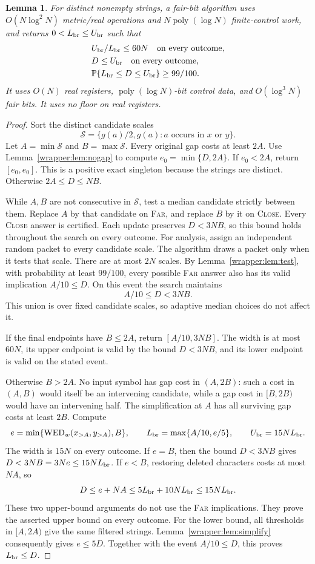 \documentclass[11pt]{article}
\newtheorem{lemma}[theorem]{Lemma}
\theoremstyle{definition}
\newcommand{\WED}{\operatorname{WED}}
\newcommand{\Prb}{\mathbb P}
\newcommand{\1}{\mathbf 1}
\begin{document}
\begin{lemma}\label{wrapper:lem:bracket}
For distinct nonempty strings, a fair-bit algorithm uses
$O(N\log^2N)$ metric/real operations and $N\operatorname{poly}(\log N)$
finite-control work, and returns $0<L_{\rm br}\le U_{\rm br}$ such that
\begin{align*}
&U_{\rm br}/L_{\rm br}\le60N\quad\hbox{on every outcome},\\
&D\le U_{\rm br}\quad\hbox{on every outcome},\\
&\Prb\{L_{\rm br}\le D\le U_{\rm br}\}\ge99/100.
\end{align*}
It uses $O(N)$ real registers, $\operatorname{poly}(\log N)$-bit control
data, and $O(\log^3N)$ fair bits. It uses no floor on real registers.
\end{lemma}
\begin{proof}
Sort the distinct candidate scales
\[
\mathcal S=\{g(a)/2,g(a):a\text{ occurs in }x\text{ or }y\}.
\]
Let $A=\min\mathcal S$ and $B=\max\mathcal S$.
Every original gap costs at least $2A$. Use Lemma~\ref{wrapper:lem:nogap} to
compute $e_0=\min\{D,2A\}$. If $e_0<2A$, return $[e_0,e_0]$.
This is a positive exact singleton because the strings are distinct.
Otherwise $2A\le D\le NB$.

While $A,B$ are not consecutive in $\mathcal S$, test a median candidate
strictly between them. Replace $A$ by that candidate on \textup{\textsc{Far}},
and replace $B$ by it on \textup{\textsc{Close}}. Every \textup{\textsc{Close}} answer is
certified. Each update preserves $D<3NB$, so this bound holds
throughout the search on every outcome.
For analysis, assign an independent random packet to every candidate
scale. The algorithm draws a packet only when it tests that scale.
There are at most $2N$ scales. By Lemma~\ref{wrapper:lem:test}, with
probability at least $99/100$, every possible \textup{\textsc{Far}} answer also
has its valid implication $A/10\le D$. On this event the search maintains
\[
A/10\le D<3NB.
\]
This union is over fixed candidate scales, so adaptive median choices
do not affect it.

If the final endpoints have $B\le2A$, return $[A/10,3NB]$.
The width is at most $60N$, its upper endpoint is valid by
the bound $D<3NB$, and its lower endpoint is valid on the stated event.

Otherwise $B>2A$. No input symbol has gap cost in $(A,2B)$: such a cost in
$(A,B)$ would itself be an intervening candidate, while a gap cost in
$[B,2B)$ would have an intervening half. The simplification at $A$ has
all surviving gap costs at least $2B$. Compute
\[
e=\min\{\WED_w(x_{>A},y_{>A}),B\},\qquad
L_{\rm br}=\max\{A/10,e/5\},\qquad U_{\rm br}=15NL_{\rm br}.
\]
The width is $15N$ on every outcome.
If $e=B$, then the bound $D<3NB$ gives $D<3NB=3Ne\le15NL_{\rm br}$.
If $e<B$, restoring deleted characters costs at most $NA$, so
\[
D\le e+NA\le5L_{\rm br}+10NL_{\rm br}\le15NL_{\rm br}.
\]
These two upper-bound arguments do not use the \textup{\textsc{Far}} implications.
They prove the asserted upper bound on every outcome.
For the lower bound, all thresholds in $[A,2A)$ give the same filtered
strings. Lemma~\ref{wrapper:lem:simplify} consequently gives $e\le5D$.
Together with the event $A/10\le D$, this proves $L_{\rm br}\le D$.


\end{proof}
\end{document}
